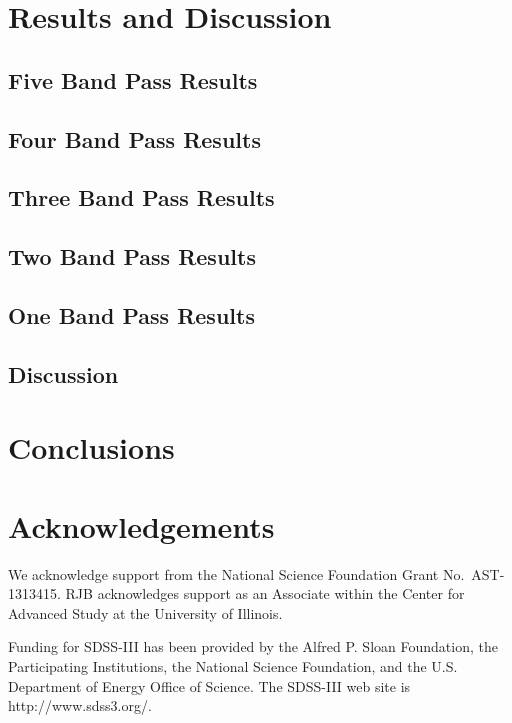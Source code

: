 \documentclass[fleqn,usenatbib]{mnras}
\begin{document}
\section{Results and Discussion}
  \label{sec:results_and_discussion}
  
\subsection{Five Band Pass Results}
  \label{sec:five_bp_res}

\subsection{Four Band Pass Results}
  \label{sec:four_bp_res}
  
\subsection{Three Band Pass Results}
  \label{sec:three_bp_res}
  
\subsection{Two Band Pass Results}
  \label{sec:two_bp_res}

\subsection{One Band Pass Results}
  \label{sec:one_bp_res}
  
\subsection{Discussion}
  \label{sec:Discussion}
  
\section{Conclusions}
  \label{sec:conclusions}

\section*{Acknowledgements}

We acknowledge support from the 
National Science Foundation Grant No.\ AST-1313415.
RJB acknowledges support as an Associate
within the Center for Advanced Study at the University of Illinois.

Funding for SDSS-III has been provided by the Alfred P. Sloan Foundation, the
Participating Institutions, the National Science Foundation, and the U.S.
Department of Energy Office of Science. The SDSS-III web site is
http://www.sdss3.org/.
\end{document}
